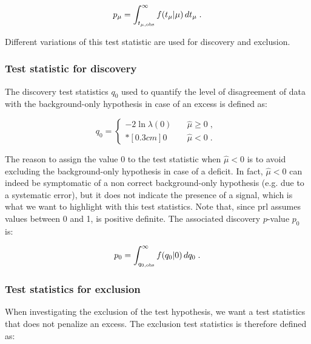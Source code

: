 \begin{equation}
\label{eq:stat:pmu}
p_{\mu} = \int_{t_{\mu,{\rm obs}}}^{\infty} f(t_{\mu} | \mu ) \,
d t_{\mu} \; .
\end{equation}

\noindent Different variations of this test statistic are used for discovery and exclusion.

\subsubsection*{Test statistic for discovery}

The discovery test statistics $q_{0}$ used to quantify the level of disagreement of data with the background-only hypothesis in case of an excess is defined as:

\begin{equation}
\label{eq:stat:q0}
q_{0} =
\left\{ \! \! \begin{array}{ll}
               - 2 \ln \lambda(0)
               & \quad \hat{\mu} \ge 0 \;, \\*[0.3 cm]
               0 & \quad \hat{\mu} < 0  \;.
              \end{array} \; \right.
\end{equation}
 
\noindent The reason to assign the value 0 to the test statistic when $\hat{\mu} < 0$ is to avoid excluding the background-only hypothesis in case of a deficit. In fact, $\hat{\mu} < 0$ can indeed be symptomatic of a non correct background-only hypothesis (e.g. due to a systematic error), but it does not indicate the presence of a signal, which is what we want to highlight with this test statistics. Note that, since \gls{prl} assumes values between 0 and 1, \qzero is positive definite. The associated discovery $p$-value $p_{0}$ is:

\begin{equation}
\label{eq:stat:p0}
p_{0} = \int_{q_{0,{\rm obs}}}^{\infty} f(q_{0} | 0 ) \, d q_{0} \; .
\end{equation}

\subsubsection*{Test statistics for exclusion}

When investigating the exclusion of the test hypothesis, we want a test statistics that does not penalize an excess. The exclusion test statistics \qmu is therefore defined as:

